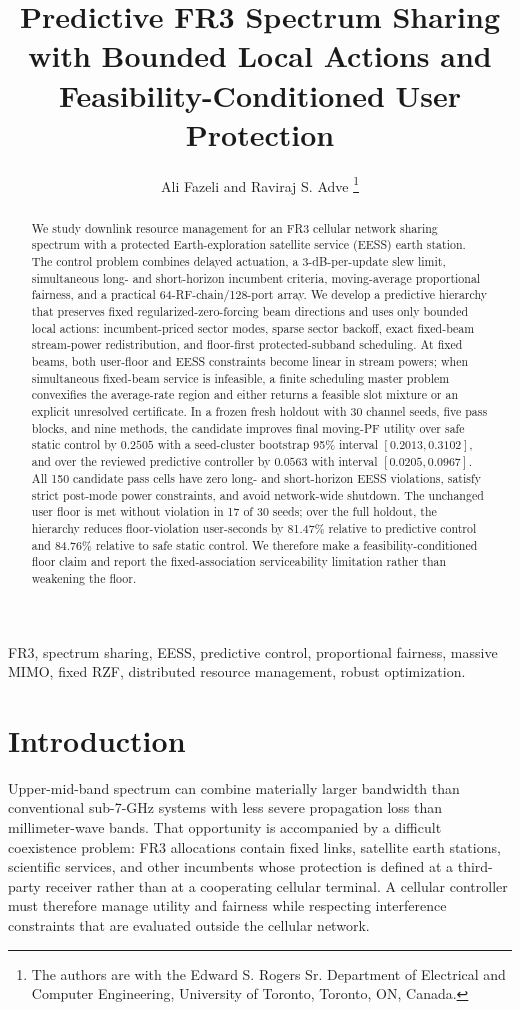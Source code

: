 \documentclass[journal]{IEEEtran}
\title{Predictive FR3 Spectrum Sharing with Bounded Local Actions and Feasibility-Conditioned User Protection}
\author{Ali Fazeli and Raviraj S. Adve%
\thanks{The authors are with the Edward S. Rogers Sr. Department of Electrical and Computer Engineering, University of Toronto, Toronto, ON, Canada.}}
\begin{document}
\maketitle

\begin{abstract}
We study downlink resource management for an FR3 cellular network sharing spectrum with a protected Earth-exploration satellite service (EESS) earth station. The control problem combines delayed actuation, a 3-dB-per-update slew limit, simultaneous long- and short-horizon incumbent criteria, moving-average proportional fairness, and a practical 64-RF-chain/128-port array. We develop a predictive hierarchy that preserves fixed regularized-zero-forcing beam directions and uses only bounded local actions: incumbent-priced sector modes, sparse sector backoff, exact fixed-beam stream-power redistribution, and floor-first protected-subband scheduling. At fixed beams, both user-floor and EESS constraints become linear in stream powers; when simultaneous fixed-beam service is infeasible, a finite scheduling master problem convexifies the average-rate region and either returns a feasible slot mixture or an explicit unresolved certificate. In a frozen fresh holdout with 30 channel seeds, five pass blocks, and nine methods, the candidate improves final moving-PF utility over safe static control by $0.2505$ with a seed-cluster bootstrap 95\% interval $[0.2013,0.3102]$, and over the reviewed predictive controller by $0.0563$ with interval $[0.0205,0.0967]$. All 150 candidate pass cells have zero long- and short-horizon EESS violations, satisfy strict post-mode power constraints, and avoid network-wide shutdown. The unchanged user floor is met without violation in 17 of 30 seeds; over the full holdout, the hierarchy reduces floor-violation user-seconds by 81.47\% relative to predictive control and 84.76\% relative to safe static control. We therefore make a feasibility-conditioned floor claim and report the fixed-association serviceability limitation rather than weakening the floor.
\end{abstract}

\begin{IEEEkeywords}
FR3, spectrum sharing, EESS, predictive control, proportional fairness, massive MIMO, fixed RZF, distributed resource management, robust optimization.
\end{IEEEkeywords}

\section{Introduction}
Upper-mid-band spectrum can combine materially larger bandwidth than conventional sub-7-GHz systems with less severe propagation loss than millimeter-wave bands. That opportunity is accompanied by a difficult coexistence problem: FR3 allocations contain fixed links, satellite earth stations, scientific services, and other incumbents whose protection is defined at a third-party receiver rather than at a cooperating cellular terminal. A cellular controller must therefore manage utility and fairness while respecting interference constraints that are evaluated outside the cellular network.
\end{document}

